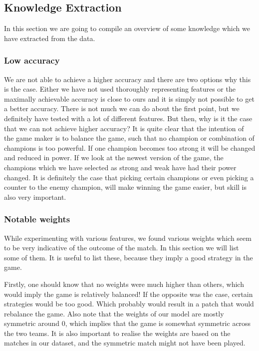 \subsection{Knowledge Extraction}\label{sub:knowledge}
In this section we are going to compile an overview of some knowledge which we have extracted from the data. 

\subsubsection{Low accuracy}

We are not able to achieve a higher accuracy and there are two options why this is the case. Either we have not used thoroughly representing features or the maximally achievable accuracy is close to ours and it is simply not possible to get a better accuracy. There is not much we can do about the first point, but we definitely have tested with a lot of different features. But then, why is it the case that we can not achieve higher accuracy? It is quite clear that the intention of the game maker is to balance the game, such that no champion or combination of champions is too powerful. If one champion becomes too strong it will be changed and reduced in power. If we look at the newest version of the game, the champions which we have selected as strong and weak have had their power changed. It is definitely the case that picking certain champions or even picking a counter to the enemy champion, will make winning the game easier, but skill is also very important. 

\subsubsection{Notable weights}

While experimenting with various features, we found various weights which seem to be very indicative of the outcome of the match. In this section we will list some of them. It is useful to list these, because they imply a good strategy in the game.

Firstly, one should know that no weights were much higher than others, which would imply the game is relatively balanced! If the opposite was the case, certain strategies would be too good. Which probably would result in a patch that would rebalance the game. Also note that the weights of our model are mostly symmetric around 0, which implies that the game is somewhat symmetric across the two teams. It is also important to realise the weights are based on the matches in our dataset, and the symmetric match might not have been played. 

